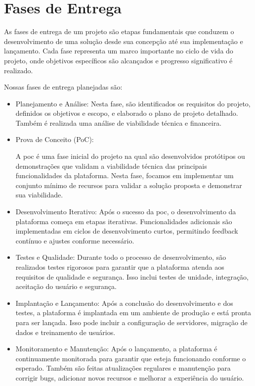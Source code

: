 \section{Fases de Entrega}

As fases de entrega de um projeto são etapas fundamentais que conduzem o desenvolvimento de uma solução desde sua concepção até sua implementação e lançamento. Cada fase representa um marco importante no ciclo de vida do projeto, onde objetivos específicos são alcançados e progresso significativo é realizado.

Nossas fases de entrega planejadas são:

\begin{itemize}
\item Planejamento e Análise:
Nesta fase, são identificados os requisitos do projeto, definidos os objetivos e escopo, e elaborado o plano de projeto detalhado. Também é realizada uma análise de viabilidade técnica e financeira.

\item Prova de Conceito (PoC):

A \ac{poc} é uma fase inicial do projeto na qual são desenvolvidos protótipos ou demonstrações que validam a viabilidade técnica das principais funcionalidades da plataforma. Nesta fase, focamos em implementar um conjunto mínimo de recursos para validar a solução proposta e demonstrar sua viabilidade.

\item Desenvolvimento Iterativo:
Após o sucesso da \acs{poc}, o desenvolvimento da plataforma começa em etapas iterativas. Funcionalidades adicionais são implementadas em ciclos de desenvolvimento curtos, permitindo feedback contínuo e ajustes conforme necessário.

\item Testes e Qualidade:
Durante todo o processo de desenvolvimento, são realizados testes rigorosos para garantir que a plataforma atenda aos requisitos de qualidade e segurança. Isso inclui testes de unidade, integração, aceitação do usuário e segurança.

\item Implantação e Lançamento:
Após a conclusão do desenvolvimento e dos testes, a plataforma é implantada em um ambiente de produção e está pronta para ser lançada. Isso pode incluir a configuração de servidores, migração de dados e treinamento de usuários.

\item Monitoramento e Manutenção:
Após o lançamento, a plataforma é continuamente monitorada para garantir que esteja funcionando conforme o esperado. Também são feitas atualizações regulares e manutenção para corrigir bugs, adicionar novos recursos e melhorar a experiência do usuário.

\end{itemize}

